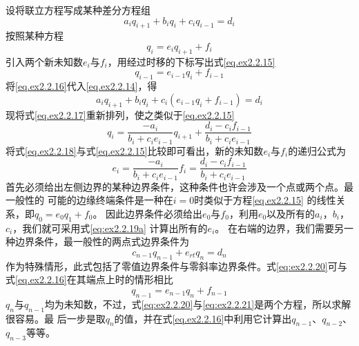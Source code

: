 设将联立方程写成某种差分方程组
\begin{equation}
a_iq_{i+1}+b_iq_i+c_iq_{i-1}=d_i
\label{eq.ex2.2.14}
\end{equation}
按照某种方程
\begin{equation}
q_i=e_iq_{i+1}+f_i
\label{eq.ex2.2.15}
\end{equation}
引入两个新未知数$e_i$与$f_i$，用经过时移的下标写出式\ref{eq.ex2.2.15}
\begin{equation}
q_{i-1}=e_{i-1}q_{i}+f_{i-1}
\label{eq.ex2.2.16}
\end{equation}
将\ref{eq.ex2.2.16}代入\ref{eq.ex2.2.14}，得
\begin{equation}
a_iq_{i+1}+b_iq_i+c_i(e_{i-1}q_{i}+f_{i-1})=d_i
\label{eq.ex2.2.17}
\end{equation}
现将式\ref{eq.ex2.2.17}重新排列，使之类似于\ref{eq.ex2.2.15}
\begin{equation}
q_i=\frac{-a_i}{b_i+c_ie_{i-1}}q_{i+1}+\frac{d_i-c_if_{i-1}}{b_i+c_ie_{i-1}} 
\label{eq.ex2.2.18}
\end{equation}
将式\ref{eq.ex2.2.18}与式\ref{eq.ex2.2.15}比较即可看出，新的未知数$e_i$与$f_i$的递归公式为
\begin{subequations}
\begin{equation}
e_i=\frac{-a_i}{b_i+c_ie_{i-1}}
\label{eq:ex2.2.19a}
\end{equation}
\begin{equation}
f_i=\frac{d_i-c_if_{i-1}}{b_i+c_ie_{i-1}} 
\label{eq:ex2.2.19b}
\end{equation}
\label{eq:ex2.2.19}
\end{subequations}
首先必须给出左侧边界的某种边界条件，这种条件也许会涉及一个点或两个点。最一般性的
可能的边缘终端条件是一种在$i=0$时类似于方程\ref{eq.ex2.2.15}
的线性关系，即$q_0=e_0q_1+f_0$。
因此边界条件必须给出$e_0$与$f_0$，利用$e_0$以及所有的$a_i$，$b_i$，$c_i$，我们就可采用式\ref{eq:ex2.2.19a}
计算出所有的$e_i$。
在右端的边界，我们需要另一种边界条件，最一般性的两点式边界条件为
\begin{equation}
c_{n-1}q_{n-1}+e_{rt}q_n=d_n
\label{eq:ex2.2.20}
\end{equation}
作为特殊情形，此式包括了零值边界条件与零斜率边界条件。式\ref{eq:ex2.2.20}可与式\ref{eq.ex2.2.16}在其端点上时的情形相比
\begin{equation}
q_{n-1}=e_{n-1}q_n+f_{n-1}
\label{eq:ex2.2.21}
\end{equation}
$q_n$与$q_{n-1}$均为未知数，不过，式\ref{eq:ex2.2.20}与\ref{eq:ex2.2.21}是两个方程，所以求解很容易。最
后一步是取$q_n$的值，并在式\ref{eq.ex2.2.16}中利用它计算出$q_{n-1}$、$q_{n-2}$、$q_{n-3}$等等。

